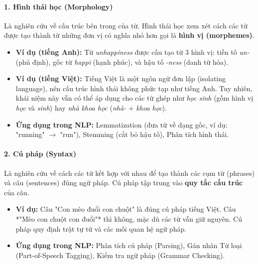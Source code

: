 \paragraph{1. Hình thái học (Morphology)}
Là nghiên cứu về cấu trúc bên trong của từ. Hình thái học xem xét cách các từ được tạo thành từ những đơn vị có nghĩa nhỏ hơn gọi là \textbf{hình vị (morphemes)}.
\begin{itemize}
    \item \textbf{Ví dụ (tiếng Anh):} Từ \textit{unhappiness} được cấu tạo từ 3 hình vị: tiền tố \textit{un-} (phủ định), gốc từ \textit{happi} (hạnh phúc), và hậu tố \textit{-ness} (danh từ hóa).
    \item \textbf{Ví dụ (tiếng Việt):} Tiếng Việt là một ngôn ngữ đơn lập (isolating language), nên cấu trúc hình thái không phức tạp như tiếng Anh. Tuy nhiên, khái niệm này vẫn có thể áp dụng cho các từ ghép như \textit{học sinh} (gồm hình vị \textit{học} và \textit{sinh}) hay \textit{nhà khoa học} (\textit{nhà-} + \textit{khoa học}).
    \item \textbf{Ứng dụng trong NLP:} Lemmatization (đưa từ về dạng gốc, ví dụ: "running" $\rightarrow$ "run"), Stemming (cắt bỏ hậu tố), Phân tích hình thái.
\end{itemize}

\paragraph{2. Cú pháp (Syntax)}
Là nghiên cứu về cách các từ kết hợp với nhau để tạo thành các cụm từ (phrases) và câu (sentences) đúng ngữ pháp. Cú pháp tập trung vào \textbf{quy tắc cấu trúc} của câu.
\begin{itemize}
    \item \textbf{Ví dụ:} Câu "Con mèo đuổi con chuột" là đúng cú pháp tiếng Việt. Câu *"Mèo con chuột con đuổi"* thì không, mặc dù các từ vẫn giữ nguyên. Cú pháp quy định trật tự từ và các mối quan hệ ngữ pháp.
    \item \textbf{Ứng dụng trong NLP:} Phân tích cú pháp (Parsing), Gán nhãn Từ loại (Part-of-Speech Tagging), Kiểm tra ngữ pháp (Grammar Checking).
\end{itemize}

